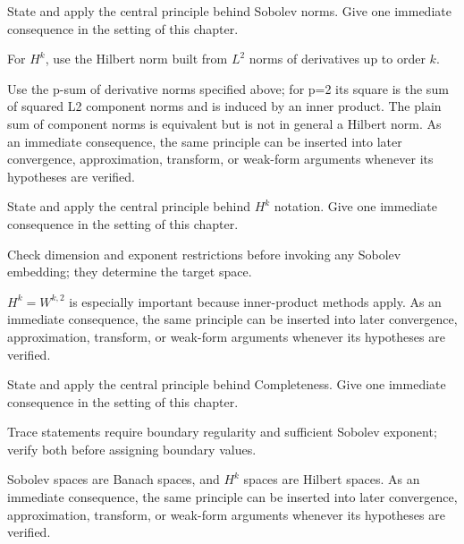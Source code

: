 \begin{exercise}\label{exr:iii21-02}
State and apply the central principle behind Sobolev norms. Give one immediate consequence in the setting of this chapter.
\end{exercise}
\begin{hint}
For \(H^k\), use the Hilbert norm built from \(L^2\) norms of derivatives up to order \(k\).
\end{hint}
\begin{solution}
Use the p-sum of derivative norms specified above; for p=2 its square is the sum of squared L2 component norms and is induced by an inner product. The plain sum of component norms is equivalent but is not in general a Hilbert norm. As an immediate consequence, the same principle can be inserted into later convergence, approximation, transform, or weak-form arguments whenever its hypotheses are verified.
\end{solution}

\begin{exercise}\label{exr:iii21-03}
State and apply the central principle behind $H^k$ notation. Give one immediate consequence in the setting of this chapter.
\end{exercise}
\begin{hint}
Check dimension and exponent restrictions before invoking any Sobolev embedding; they determine the target space.
\end{hint}
\begin{solution}
$H^k=W^{k,2}$ is especially important because inner-product methods apply. As an immediate consequence, the same principle can be inserted into later convergence, approximation, transform, or weak-form arguments whenever its hypotheses are verified.
\end{solution}

\begin{exercise}\label{exr:iii21-04}
State and apply the central principle behind Completeness. Give one immediate consequence in the setting of this chapter.
\end{exercise}
\begin{hint}
Trace statements require boundary regularity and sufficient Sobolev exponent; verify both before assigning boundary values.
\end{hint}
\begin{solution}
Sobolev spaces are Banach spaces, and $H^k$ spaces are Hilbert spaces. As an immediate consequence, the same principle can be inserted into later convergence, approximation, transform, or weak-form arguments whenever its hypotheses are verified.
\end{solution}

